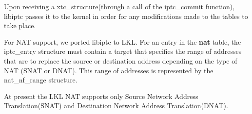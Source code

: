{{\lstset{language=C, caption=TC_INIT}


Upon receiving a xtc_structure(through a call of the iptc_commit function), libiptc passes it to the kernel in order for any modifications made to the tables to take place.

For NAT support, we ported libiptc to LKL.
For an entry in the \textbf{nat} table, the iptc_entry structure must contain a target that specifies the range 
of addresses that are to replace the source or destination address depending on the type of NAT (SNAT or DNAT). 
This range of addresses is represented by the nat_nf_range structure.

\lstset{language=C, caption=struct nat_nf_range}


At present the LKL NAT supports only  Source Network Address Translation(SNAT) and  Destination Network Address Translation(DNAT).

}}
